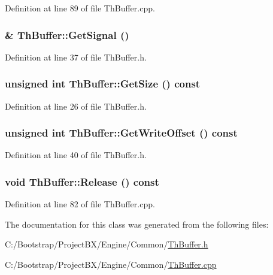 Definition at line 89 of file ThBuffer.cpp.\hypertarget{class_th_buffer_c2bc5bbc82b316254435801fe9687644}{
\subsubsection[{GetSignal}]{\& ThBuffer::GetSignal ()}}
\label{class_th_buffer_c2bc5bbc82b316254435801fe9687644}




Definition at line 37 of file ThBuffer.h.\hypertarget{class_th_buffer_1db647c615af650675ecf0a3a696036b}{
\subsubsection[{GetSize}]{\setlength{\rightskip}{0pt plus 5cm}unsigned int ThBuffer::GetSize () const}}
\label{class_th_buffer_1db647c615af650675ecf0a3a696036b}




Definition at line 26 of file ThBuffer.h.\hypertarget{class_th_buffer_bc6500a64a45ea7510dd490749fa67de}{
\subsubsection[{GetWriteOffset}]{\setlength{\rightskip}{0pt plus 5cm}unsigned int ThBuffer::GetWriteOffset () const}}
\label{class_th_buffer_bc6500a64a45ea7510dd490749fa67de}




Definition at line 40 of file ThBuffer.h.\hypertarget{class_th_buffer_8d1ec8f6cb1060228d414106bb334754}{
\subsubsection[{Release}]{\setlength{\rightskip}{0pt plus 5cm}void ThBuffer::Release () const}}
\label{class_th_buffer_8d1ec8f6cb1060228d414106bb334754}




Definition at line 82 of file ThBuffer.cpp.

The documentation for this class was generated from the following files:\begin{CompactItemize}
\item 
C:/Bootstrap/ProjectBX/Engine/Common/\hyperlink{_th_buffer_8h}{ThBuffer.h}\item 
C:/Bootstrap/ProjectBX/Engine/Common/\hyperlink{_th_buffer_8cpp}{ThBuffer.cpp}\end{CompactItemize}
